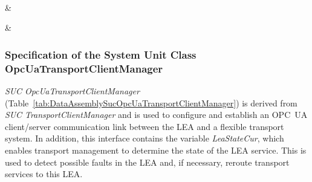 \begin{footnotesize}
\begin{longtable}
		  \\ \hline
		
		\\ \hline
	
		\\ \hline
	
		     & 
		\\ \hline
	
		     & 
		\\ \hline
	
	\end{longtable}
\end{footnotesize}

\subsubsection{Specification of the System Unit Class OpcUaTransportClientManager}

\emph{SUC OpcUaTransportClientManager} (Table~\ref{tab:DataAssemblySucOpcUaTransportClientManager}) is derived from \emph{SUC TransportClientManager} and is used to configure and establish an OPC~UA client/server communication link between the LEA and a flexible transport system. In addition, this interface contains the variable \emph{LeaStateCur}, which enables transport management to determine the state of the LEA service. This is used to detect possible faults in the LEA and, if necessary, reroute transport services to this LEA.

